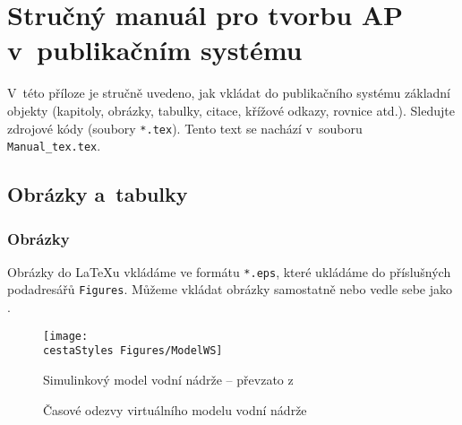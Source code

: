 ﻿\chapter[Stručný manuál pro \LaTeXe]{Stručný manuál pro tvorbu AP v~publikačním systému \LaTeXe \label{ch:Manual_tex}}


V~této příloze je stručně uvedeno, jak vkládat do publikačního systému \LaTeXe\/ základní objekty (kapitoly, obrázky, tabulky, citace, křížové odkazy, rovnice atd.). Sledujte zdro\-jo\-vé kódy (soubory {\rm \texttt{*.tex}}). Tento text se nachází v~souboru \texttt{\cestaStyles Manual\_tex.tex}.



\section{Obrázky a~tabulky}


\subsection{Obrázky}

Obrázky do LaTeXu vkládáme ve formátu \verb"*.eps", které ukládáme do příslušných podadresářů \texttt{Figures}. Můžeme vkládat obrázky samostatně nebo vedle sebe jako .

\begin{figure}[H]
\begin{center}
    {\texttt{[image: \\cestaStyles Figures/ModelWS]}}
    \caption[Simulinkový model vodní nádrže -- převzato z~\protect\cite{Book:ROUBAL-HUSEK-kol_RTvP}]
        {Simulinkový model vodní nádrže -- převzato z~\protect\cite[Příloha\?: VR\_Toolbox\_Water.pdf]{Book:ROUBAL-HUSEK-kol_RTvP}}
    \label{fig:ModelWS}
\end{center}
\end{figure}

\begin{figure}[H]
\begin{center}
  \hspace{1cm}
  \caption[Časové odezvy virtuálního modelu vodní nádrže]
    {Časové odezvy virtuálního modelu vodní nádrže\protect\footnotemark}
  \label{fig:Data}
\end{center}
\end{figure}

